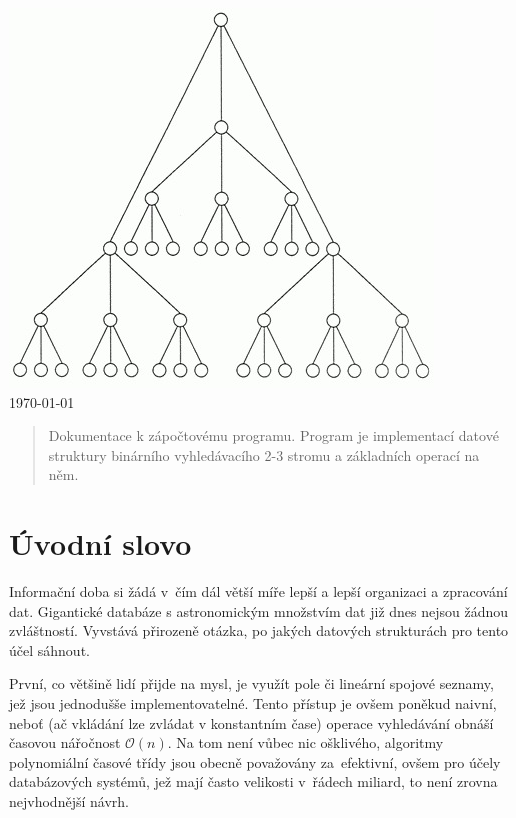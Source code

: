 \documentclass[11pt,a4paper]{article}
\begin{document}
\begin{titlepage}
\begin{center}
\vfill
\includegraphics[viewport=330 50 100 100,scale=0.5]{./tree.jpg}\\[1cm]    

{\large \today}

\end{center}

\end{titlepage}

\begin{abstract}
Dokumentace k zápočtovému programu.
Program je implementací datové struktury binárního vyhledávacího 2-3 stromu a
základních operací na něm.
\end{abstract}

\pagebreak

\tableofcontents

\pagebreak

\part{Úvodní slovo}
Informační doba si žádá v~čím dál větší míře lepší a lepší organizaci a
zpracování dat.
Gigantické databáze s astronomickým množstvím dat již dnes nejsou žádnou
zvláštností.
Vyvstává přirozeně otázka, po jakých datových strukturách pro tento účel
sáhnout.

První, co většině lidí přijde na mysl, je využít pole či lineární spojové
seznamy, jež jsou jednodušše implementovatelné.
Tento přístup je ovšem poněkud naivní, neboť (ač vkládání lze zvládat v
konstantním čase) operace vyhledávání obnáší časovou nářočnost
$\mathcal{O}(n)$. 
Na tom není vůbec nic ošklivého, algoritmy polynomiální časové třídy jsou
obecně považovány za~e\-fektivní, ovšem pro účely databázových systémů, jež mají
často velikosti v~řádech miliard, to není zrovna nejvhodnější návrh. 
\end{document}
